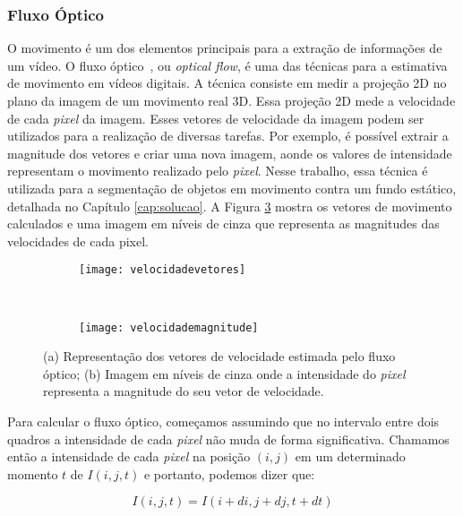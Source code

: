 \subsubsection{Fluxo Óptico}\label{sec:fluxooptico}

O movimento é um dos elementos principais para a extração de informações de um vídeo. O fluxo óptico~\cite{mota2011tensor}, ou \textit{optical flow}, é uma das técnicas para a estimativa de movimento em vídeos digitais. A técnica consiste em medir a projeção 2D no plano da imagem de um movimento real 3D. Essa projeção 2D mede a velocidade de cada \textit{pixel} da imagem. Esses vetores de velocidade da imagem podem ser utilizados para a realização de diversas tarefas. Por exemplo, é possível extrair a magnitude dos vetores e criar uma nova imagem, aonde os valores de intensidade representam o movimento realizado pelo \textit{pixel}. Nesse trabalho, essa técnica é utilizada para a segmentação de objetos em movimento contra um fundo estático, detalhada no Capítulo \ref{cap:solucao}. A Figura \ref{fig:fluxo} mostra os vetores de movimento calculados e uma imagem em níveis de cinza que representa as magnitudes das velocidades de cada pixel.

\begin{figure}
 \centering
\begin{subfigure}{.5\textwidth}
  \centering
  \texttt{[image: velocidadevetores]}
	\caption{}
	\label{fig:fluxo:sub:vetores}
	\centering
\end{subfigure}\
\begin{subfigure}{.5\textwidth}
  \centering
  \texttt{[image: velocidademagnitude]}
	\caption{}
	\label{fig:fluxo:sub:magnitude}
	\centering
\end{subfigure}
\caption{(a) Representação dos vetores de velocidade estimada pelo fluxo óptico; (b) Imagem em níveis de cinza onde a intensidade do \textit{pixel} representa a magnitude do seu vetor de velocidade.}
\label{fig:fluxo}
\centering
\end{figure}

Para calcular o fluxo óptico, começamos assumindo que no intervalo entre dois quadros a intensidade de cada \textit{pixel} não muda de forma significativa. Chamamos então a intensidade de cada \textit{pixel} na posição $(i,j)$ em um determinado momento $t$ de $I(i,j,t)$ e portanto, podemos dizer que: 

\begin{equation}
	I(i,j,t) = I(i+di, j+dj, t+dt)
\label{eq:fluxo1}
\end{equation} 

